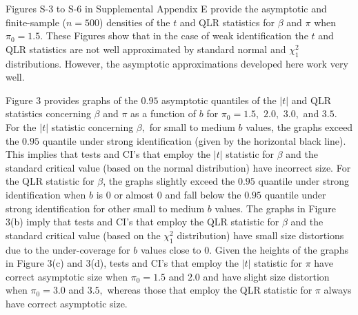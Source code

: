 \documentclass[12pt,titlepage,final,oneside,letterpaper]{article}
\begin{document}
Figures S-3 to S-6 in Supplemental Appendix E provide the asymptotic and
finite-sample ($n=500$) densities of the $t$ and QLR statistics for $\beta $
and $\pi $ when $\pi _{0}=1.5.$ These Figures show that in the case of weak
identification the $t$ and QLR statistics are not well approximated by
standard normal and $\chi _{1}^{2}$ distributions. However, the asymptotic
approximations developed here work very well.



Figure 3 provides graphs of the $0.95$ asymptotic quantiles of the $|t|$ and
QLR statistics concerning $\beta $ and $\pi $ as a function of $b$ for $\pi
_{0}=1.5,$ $2.0,$ $3.0,$ and $3.5.$ For the $|t|$ statistic concerning $%
\beta ,$ for small to medium $b$ values, the graphs exceed the $0.95$
quantile under strong identification (given by the horizontal black line).
This implies that tests and CI's that employ the $|t|$ statistic for $\beta $
and the standard critical value (based on the normal distribution) have
incorrect size. For the QLR statistic for $\beta $, the graphs slightly
exceed the $0.95$ quantile under strong identification when $b$ is $0$ or
almost $0$ and fall below the $0.95$ quantile under strong identification
for other small to medium $b$ values. The graphs in Figure 3(b) imply that
tests and CI's that employ the QLR statistic for $\beta $ and the standard
critical value (based on the $\chi _{1}^{2}$ distribution) have small size
distortions due to the under-coverage for $b$ values close to $0.$ Given the
heights of the graphs in Figure 3(c) and 3(d), tests and CI's that employ
the $|t|$ statistic for $\pi $ have correct asymptotic size when $\pi
_{0}=1.5$ and $2.0$ and have slight size distortion when $\pi _{0}=3.0$ and $%
3.5,$ whereas those that employ the QLR statistic for $\pi $ always have
correct asymptotic size.
\end{document}
